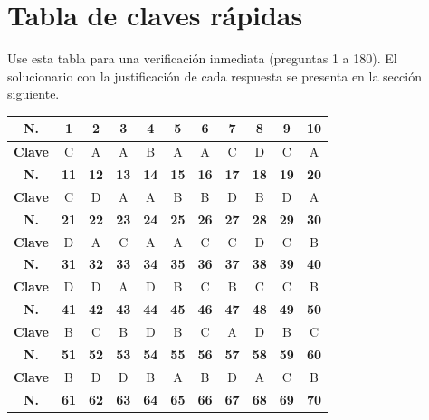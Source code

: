\newpage
\section*{Tabla de claves rápidas}

\noindent Use esta tabla para una verificación inmediata (preguntas 1 a 180). El solucionario con la justificación de cada respuesta se presenta en la sección siguiente.

\vspace{0.35cm}
\begin{center}
\footnotesize
\renewcommand{\arraystretch}{1.25}
\begin{tabular}{|c|c|c|c|c|c|c|c|c|c|c|}
\hline
\textbf{N.} & \textbf{1} & \textbf{2} & \textbf{3} & \textbf{4} & \textbf{5} & \textbf{6} & \textbf{7} & \textbf{8} & \textbf{9} & \textbf{10} \\
\hline
\textbf{Clave} & C & A & A & B & A & A & C & D & C & A \\
\hline
\textbf{N.} & \textbf{11} & \textbf{12} & \textbf{13} & \textbf{14} & \textbf{15} & \textbf{16} & \textbf{17} & \textbf{18} & \textbf{19} & \textbf{20} \\
\hline
\textbf{Clave} & C & D & A & A & B & B & D & B & D & A \\
\hline
\textbf{N.} & \textbf{21} & \textbf{22} & \textbf{23} & \textbf{24} & \textbf{25} & \textbf{26} & \textbf{27} & \textbf{28} & \textbf{29} & \textbf{30} \\
\hline
\textbf{Clave} & D & A & C & A & A & C & C & D & C & B \\
\hline
\textbf{N.} & \textbf{31} & \textbf{32} & \textbf{33} & \textbf{34} & \textbf{35} & \textbf{36} & \textbf{37} & \textbf{38} & \textbf{39} & \textbf{40} \\
\hline
\textbf{Clave} & D & D & A & D & B & C & B & C & C & B \\
\hline
\textbf{N.} & \textbf{41} & \textbf{42} & \textbf{43} & \textbf{44} & \textbf{45} & \textbf{46} & \textbf{47} & \textbf{48} & \textbf{49} & \textbf{50} \\
\hline
\textbf{Clave} & B & C & B & D & B & C & A & D & B & C \\
\hline
\textbf{N.} & \textbf{51} & \textbf{52} & \textbf{53} & \textbf{54} & \textbf{55} & \textbf{56} & \textbf{57} & \textbf{58} & \textbf{59} & \textbf{60} \\
\hline
\textbf{Clave} & B & D & D & B & A & B & D & A & C & B \\
\hline
\textbf{N.} & \textbf{61} & \textbf{62} & \textbf{63} & \textbf{64} & \textbf{65} & \textbf{66} & \textbf{67} & \textbf{68} & \textbf{69} & \textbf{70} \\

\end{tabular}
\end{center}
